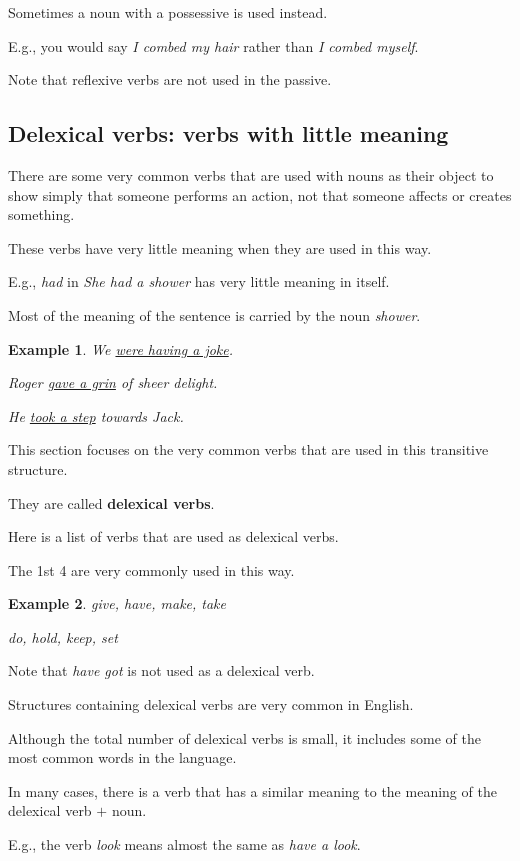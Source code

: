 \documentclass[oneside]{book}
\numberwithin{equation}{section}
\newtheorem{example}{Example}[section]
\begin{document}
Sometimes a noun with a possessive is used instead.

E.g., you would say \textit{I combed my hair} rather than \textit{I combed myself}.

%
\noindent{} Note that reflexive verbs are not used in the passive.

\subsection{Delexical verbs: verbs with little meaning}
\noindent{} There are some very common verbs that are used with nouns as their object to show simply that someone performs an action, not that someone affects or creates something.

These verbs have very little meaning when they are used in this way.

%
E.g., \textit{had} in \textit{She had a shower} has very little meaning in itself.

Most of the meaning of the sentence is carried by the noun \textit{shower}.
\begin{example}
    We \underline{were having a joke}.
    
    Roger \underline{gave a grin} of sheer delight.
    
    He \underline{took a step} towards Jack.
\end{example}
%
\noindent{} This section focuses on the very common verbs that are used in this transitive structure.

They are called \textbf{delexical verbs}.

%
Here is a list of verbs that are used as delexical verbs.

The 1st 4 are very commonly used in this way.
\begin{example}
    give, have, make, take
    
    do, hold, keep, set
\end{example}
Note that \textit{have got} is not used as a delexical verb.

%
Structures containing delexical verbs are very common in English.

Although the total number of delexical verbs is small, it includes some of the most common words in the language.

%
\noindent{} In many cases, there is a verb that has a similar meaning to the meaning of the delexical verb $+$ noun.

E.g., the verb \textit{look} means almost the same as \textit{have a look}.
\end{document}
